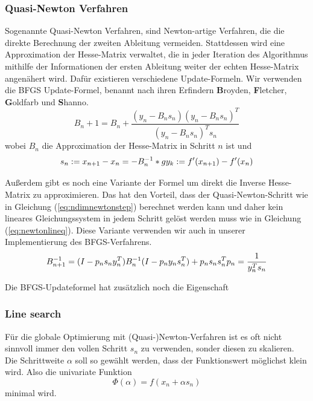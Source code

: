 \documentclass[runningheads,a4paper]{llncs}
\begin{document}
\subsubsection{Quasi-Newton Verfahren}

Sogenannte Quasi-Newton Verfahren, sind Newton-artige Verfahren, die die direkte Berechnung der zweiten Ableitung vermeiden. Stattdessen wird eine Approximation der Hesse-Matrix verwaltet, die in jeder Iteration des Algorithmus mithilfe der Informationen der ersten Ableitung weiter der echten Hesse-Matrix angenähert wird. Dafür existieren verschiedene Update-Formeln. Wir verwenden die BFGS Update-Formel, benannt nach ihren Erfindern \textbf{B}royden, \textbf{F}letcher, \textbf{G}oldfarb und \textbf{S}hanno. \cite{nocedal1999numerical}
\begin{equation*}
B_n+1 = B_n + \frac{(y_n- B_ns_n) (y_n-B_ns_n)^T}{(y_n- B_n s_n)^T s_n}
\end{equation*}
wobei $B_n$ die Approximation der Hesse-Matrix in Schritt $n$ ist und
\begin{equation*}
s_n := x_{n+1} - x_n = -B_n^{-1}*g\\
y_k := f'(x_{n+1}) - f'(x_n)
\end{equation*}

Außerdem gibt es noch eine Variante der Formel um direkt die Inverse Hesse-Matrix zu approximieren. Das hat den Vorteil, dass der Quasi-Newton-Schritt wie in Gleichung (\ref{eq:ndimnewtonstep}) berechnet werden kann und daher kein lineares Gleichungssystem in jedem Schritt gelöst werden muss wie in Gleichung (\ref{eq:newtonlineq}). Diese Variante verwenden wir auch in unserer Implementierung des BFGS-Verfahrens.
\begin{equation}
\label{eq:bfgsinverse}
B_{n+1}^{-1} = (I - p_n s_n y_n^T) B_n^{-1} (I - p_n y_n s_n^T) + p_n s_n s_n^T \\ p_n = \frac{1}{y_n^Ts_n}
\end{equation}

Die BFGS-Updateformel hat zusätzlich noch die Eigenschaft 

\subsubsection{Line search}

Für die globale Optimierung mit (Quasi-)Newton-Verfahren ist es oft nicht sinnvoll immer den vollen Schritt $s_n$ zu verwenden, sonder diesen zu skalieren. Die Schrittweite $\alpha$ soll so gewählt werden, dass der Funktionswert möglichst klein wird. Also die univariate Funktion
\begin{equation*}
\Phi(\alpha) = f(x_n + \alpha s_n)
\end{equation*}
minimal wird.
\end{document}
